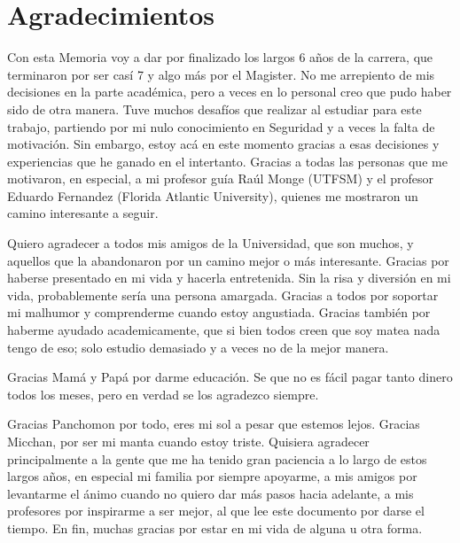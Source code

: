 \chapter*{Agradecimientos}
\label{chap:agrad}

Con esta Memoria voy a dar por finalizado los largos 6 años de la carrera, que terminaron por ser casí 7 y algo más por el Magister. No me arrepiento de mis decisiones en la parte académica, pero a veces en lo personal creo que pudo haber sido de otra manera. Tuve muchos desafíos que realizar al estudiar para este trabajo, partiendo por mi nulo conocimiento en Seguridad y a veces la falta de motivación. Sin embargo, estoy acá en este momento gracias a esas decisiones y experiencias que he ganado en el intertanto. Gracias a todas las personas que me motivaron, en especial, a mi profesor guía Raúl Monge (UTFSM) y el profesor Eduardo Fernandez (Florida Atlantic University), quienes me mostraron un camino interesante a seguir.

Quiero agradecer a todos mis amigos de la Universidad, que son muchos, y aquellos que la abandonaron por un camino mejor o más interesante. Gracias por haberse presentado en mi vida y hacerla entretenida. Sin la risa y diversión en mi vida, probablemente sería una persona amargada. Gracias a todos por soportar mi malhumor y comprenderme cuando estoy angustiada. Gracias también por haberme ayudado academicamente, que si bien todos creen que soy matea nada tengo de eso; solo estudio demasiado y a veces no de la mejor manera.

Gracias Mamá y Papá por darme educación. Se que no es fácil pagar tanto dinero todos los meses, pero en verdad se los agradezco siempre. 

Gracias Panchomon por todo, eres mi sol a pesar que estemos lejos. Gracias Micchan, por ser mi manta cuando estoy triste. Quisiera agradecer principalmente a la gente que me ha tenido gran paciencia a lo largo de estos largos años, en especial mi familia por siempre apoyarme, a mis amigos por levantarme el ánimo cuando no quiero dar más pasos hacia adelante, a mis profesores por inspirarme a ser mejor, al que lee este documento por darse el tiempo. En fin, muchas gracias por estar en mi vida de alguna u otra forma.